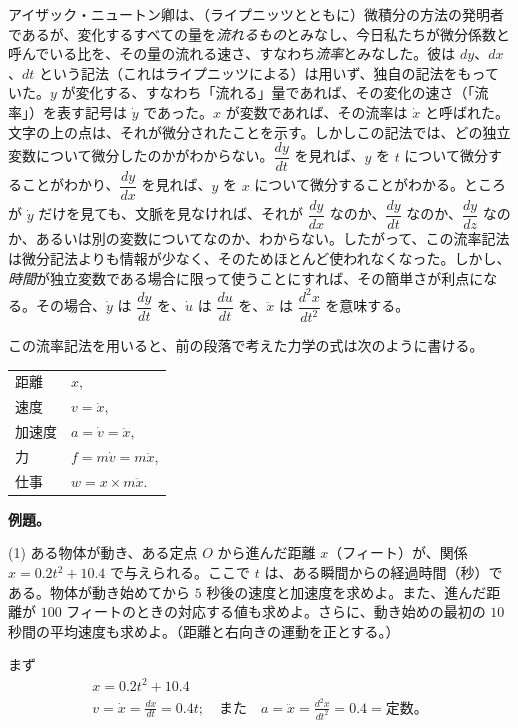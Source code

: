 \documentclass[a4paper,11pt,openany]{ltjsbook}
\begin{document}
アイザック・ニュートン卿は、（ライプニッツとともに）微積分の方法の発明者であるが、変化するすべての量を\emph{流れるもの}とみなし、今日私たちが微分係数と呼んでいる比を、その量の流れる速さ、すなわち\emph{流率}とみなした。彼は $dy$、$dx$、$dt$ という記法（これはライプニッツによる）は用いず、独自の記法をもっていた。$y$ が変化する、すなわち「流れる」量であれば、その変化の速さ（「流率」）を表す記号は $\dot{y}$ であった。$x$ が変数であれば、その流率は $\dot{x}$ と呼ばれた。文字の上の点は、それが微分されたことを示す。しかしこの記法では、どの独立変数について微分したのかがわからない。$\dfrac{dy}{dt}$ を見れば、$y$ を $t$ について微分することがわかり、$\dfrac{dy}{dx}$ を見れば、$y$ を $x$ について微分することがわかる。ところが $\dot{y}$ だけを見ても、文脈を見なければ、それが $\dfrac{dy}{dx}$ なのか、$\dfrac{dy}{dt}$ なのか、$\dfrac{dy}{dz}$ なのか、あるいは別の変数についてなのか、わからない。したがって、この流率記法は微分記法よりも情報が少なく、そのためほとんど使われなくなった。しかし、\emph{時間}が独立変数である場合に限って使うことにすれば、その簡単さが利点になる。その場合、$\dot{y}$ は $\dfrac{dy}{dt}$ を、$\dot{u}$ は $\dfrac{du}{dt}$ を、$\ddot{x}$ は $\dfrac{d^2x}{dt^2}$ を意味する。

この流率記法を用いると、前の段落で考えた力学の式は次のように書ける。

\begin{center}
\begin{tabular}{l@{\qquad\qquad}l}
距離 & $x$, \\
速度 & $v = \dot{x}$, \\
加速度 & $a = \dot{v} = \ddot{x}$, \\
力 & $f = m\dot{v} = m\ddot{x}$, \\
仕事 & $w = x \times m \ddot{x}$.
\end{tabular}
\end{center}

\textbf{例題。}

(1) ある物体が動き、ある定点 $O$ から進んだ距離 $x$（フィート）が、関係 $x = 0.2t^2 + 10.4$ で与えられる。ここで $t$ は、ある瞬間からの経過時間（秒）である。物体が動き始めてから $5$ 秒後の速度と加速度を求めよ。また、進んだ距離が $100$ フィートのときの対応する値も求めよ。さらに、動き始めの最初の $10$ 秒間の平均速度も求めよ。（距離と右向きの運動を正とする。）

まず
\begin{gather*}
x = 0.2t^2 + 10.4 \\
v = \dot{x} = \frac{dx}{dt} = 0.4t;\quad \text{また}\quad
a = \ddot{x} = \frac{d^2x}{dt^2} = 0.4 = \text{定数。}
\end{gather*}
\end{document}
